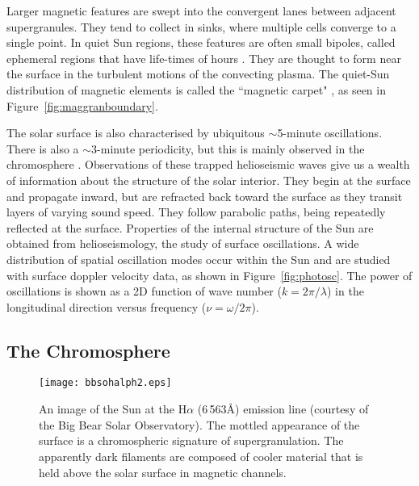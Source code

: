 Larger magnetic features are swept into the convergent lanes between adjacent supergranules. They tend to collect in sinks, where multiple cells converge to a single point. In quiet Sun regions, these features are often small bipoles, called ephemeral regions that have life-times of hours \citep{Hagenaar:2001}. They are thought to form near the surface in the turbulent motions of the convecting plasma. The quiet-Sun distribution of magnetic elements is called the ``magnetic carpet" \citep{Schrijver:1997b}, as seen in Figure~\ref{fig:maggranboundary}.

The solar surface is also characterised by ubiquitous $\sim$5-minute oscillations. %
There is also a $\sim$3-minute periodicity, but this is mainly observed in the chromosphere \citep{Solanki:2003}. 
Observations of these trapped helioseismic waves give us a wealth of information about the structure of the solar interior. They begin at the surface and  propagate inward, but are refracted  back toward the surface as they transit layers of varying sound speed. They follow parabolic paths, being repeatedly reflected at the surface. Properties of the internal structure of the Sun are obtained from helioseismology, the study of surface oscillations. A wide distribution of spatial oscillation modes occur within the Sun and are studied with surface  doppler velocity data, as shown in Figure~\ref{fig:photosc}. The power of oscillations is shown as a 2D function of wave number ($k = 2\pi/\lambda$) in the longitudinal direction versus frequency ($\nu = \omega/2\pi$).


\subsection{The Chromosphere}\label{sect:chroma}

\begin{figure}[!t]
\centerline{\texttt{[image: bbsohalph2.eps]}}
\caption[An image of the Sun at the H$\alpha$ absorption line.]{An image of the Sun at the H$\alpha$ (6\,563\AA) emission line (courtesy of the Big Bear Solar Observatory). The mottled appearance of the surface is a chromospheric signature of supergranulation. The apparently dark filaments are composed of cooler material that is held above the solar surface in magnetic channels.}
\label{fig:chromfd}
\end{figure}

